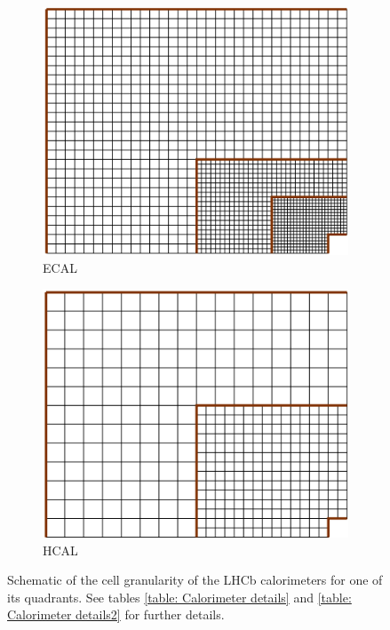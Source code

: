 \begin{figure}[h]
	\centering
	\begin{subfigure}[b]{0.45\textwidth}
		\centering
		\includegraphics[width=\textwidth]{./Chapters/detector/calorimeter/ecal_graularity.png}
		\caption{ECAL}	
		\label{fig: ECAL granularity}
	\end{subfigure}
	\begin{subfigure}[b]{0.45\textwidth}
		\centering
		\includegraphics[width=\textwidth]{./Chapters/detector/calorimeter/hcal_granularity.png}
		\caption{HCAL}	
		\label{fig: HCAL granularity}
	\end{subfigure}
	\caption{Schematic of the cell granularity of the LHCb calorimeters for one of its quadrants. See tables \ref{table: Calorimeter details} and \ref{table: Calorimeter details2} for further details.}
\end{figure}

